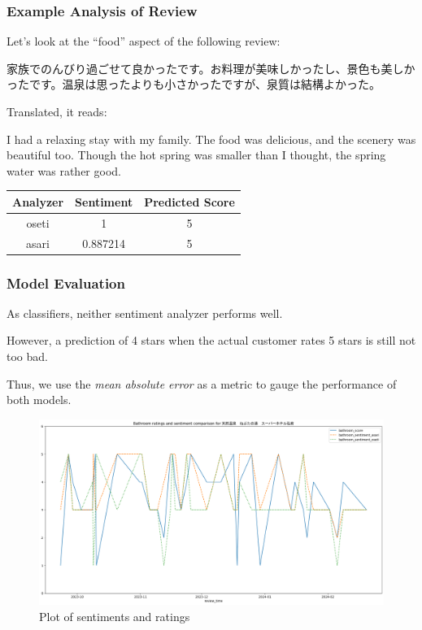 \documentclass[11pt]{beamer}
\begin{document}
	\begin{frame}
		\frametitle{Example Analysis of Review}
		Let's look at the ``food'' aspect of the following review: \begin{flushleft}
			家族でのんびり過ごせて良かったです。お料理が美味しかったし、景色も美しかったです。温泉は思ったよりも小さかったですが、泉質は結構よかった。
		\end{flushleft}
		Translated, it reads: \begin{flushleft}
			I had a relaxing stay with my family. The food was delicious, and the scenery was beautiful too. Though the hot spring was smaller than I thought, the spring water was rather good.
		\end{flushleft}
		\pause
		\begin{table}
			\begin{tabular}{|c|c|c|}
				\hline
				Analyzer & Sentiment & Predicted Score\\
				\hline
				oseti & 1 & 5\\
				\hline
				asari & 0.887214 & 5\\
				\hline
			\end{tabular}
		\end{table}
	\end{frame}
	
	\begin{frame}
		\frametitle{Model Evaluation}
		As classifiers, neither sentiment analyzer performs well.
		
		However, a prediction of 4 stars when the actual customer rates 5 stars is still not too bad.
		\pause
		
		Thus, we use the \emph{mean absolute error} as a metric to gauge the performance of both models.
	\end{frame}
	
	\begin{frame}
		\begin{figure}
			\begin{center}
				\includegraphics[scale=0.25]{sentiments_graph}
			\end{center}
			\caption{Plot of sentiments and ratings}
		\end{figure}
	\end{frame}
	
\end{document}
